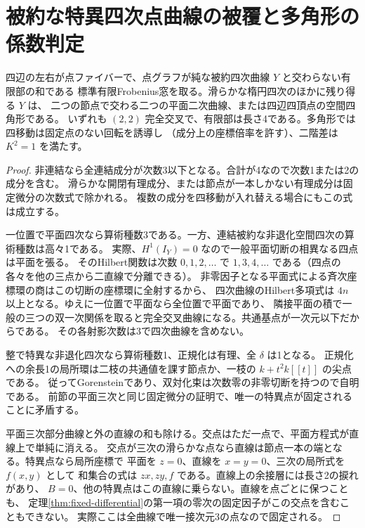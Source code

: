 \section{被約な特異四次点曲線の被覆と多角形の係数判定}
\label{sec:reduced-quartic-point-curves}
\begin{theorem}\label{thm:reduced-quartic-point-curves}
四辺の左右が点ファイバーで、点グラフが純な被約四次曲線 $Y$ と交わらない有限部の和である
標準有限Frobenius窓を取る。滑らかな楕円四次のほかに残り得る $Y$ は、
二つの節点で交わる二つの平面二次曲線、または四辺四頂点の空間四角形である。
いずれも $(2,2)$ 完全交叉で、有限部は長さ4である。多角形では四移動は固定点のない回転を誘導し
（成分上の座標倍率を許す）、二階差は $K^2=1$ を満たす。
\end{theorem}
\begin{proof}
非連結なら全連結成分が次数3以下となる。合計が4なので次数1または2の成分を含む。
滑らかな開閉有理成分、または節点が一本しかない有理成分は固定微分の次数式で除かれる。
複数の成分を四移動が入れ替える場合にもこの式は成立する。

一位置で平面四次なら算術種数3である。一方、連結被約な非退化空間四次の算術種数は高々1である。
実際、$H^1(I_Y)=0$ なので一般平面切断の相異なる四点は平面を張る。
そのHilbert関数は次数 $0,1,2,\ldots$ で $1,3,4,\ldots$ である（四点の各々を他の三点から二直線で分離できる）。
非零因子となる平面式による斉次座標環の商はこの切断の座標環に全射するから、
四次曲線のHilbert多項式は $4n$ 以上となる。ゆえに一位置で平面なら全位置で平面であり、
隣接平面の積で一般の三つの双一次関係を取ると完全交叉曲線になる。共通基点が一次元以下だからである。
その各射影次数は3で四次曲線を含めない。

整で特異な非退化四次なら算術種数1、正規化は有理、全 $\delta$ は1となる。
正規化への余長1の局所環は二枝の共通値を課す節点か、一枝の $k+t^2k[[t]]$ の尖点である。
従ってGorensteinであり、双対化束は次数零の非零切断を持つので自明である。
前節の平面三次と同じ固定微分の証明で、唯一の特異点が固定されることに矛盾する。

平面三次部分曲線と外の直線の和も除ける。交点はただ一点で、平面方程式が直線上で単純に消える。
交点が三次の滑らかな点なら直線は節点一本の端となる。特異点なら局所座標で
平面を $z=0$、直線を $x=y=0$、三次の局所式を $f(x,y)$ として
和集合の式は $zx,zy,f$ である。直線上の余接層には長さ2の捩れがあり、
$B=0$、他の特異点はこの直線に乗らない。直線を点ごとに保つことも、
定理\ref{thm:fixed-differential}の第一項の零次の固定因子がこの交点を含むこともできない。
実際ここは全曲線で唯一接次元3の点なので固定される。


\end{proof}

